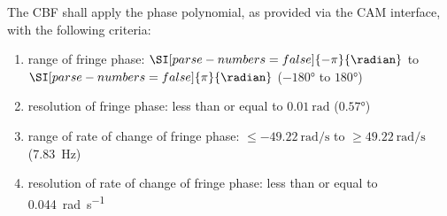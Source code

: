 The CBF shall apply the phase polynomial, as provided via the
CAM interface, with the following criteria:
\begin{enumerate}
\item range of fringe phase: $\SI[parse-numbers=false]{-\pi}{\radian}$ to
$\SI[parse-numbers=false]{\pi}{\radian}$ ($\ang{-180}$ to $\ang{+180}$)
\item resolution of fringe phase: less than or equal to $\SI{0.01}{\radian}$
($\ang{0.57}$)
\item range of rate of change of fringe phase: $\le
\SI{-49.22}{\radian\per\second}$ to $\ge \SI{49.22}{\radian\per\second}$
(\SI{7.83}{\hertz})
\item resolution of rate of change of fringe phase: less than or equal to
\SI{0.044}{\radian\per\second}
\end{enumerate}
